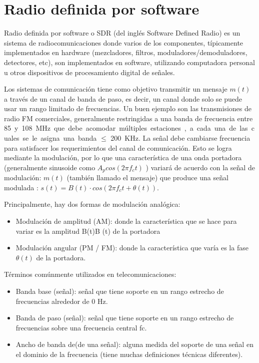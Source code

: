 \section{Radio definida por software}

Radio definida por software o SDR (del inglés Software Defined Radio) es un sistema de radiocomunicaciones donde varios de los componentes, típicamente implementados en hardware (mezcladores, filtros, moduladores/demoduladores, detectores, etc), son implementados en software, utilizando computadora personal u otros dispositivos de procesamiento digital de señales. 


Los sistemas de comunicación tiene como objetivo transmitir un mensaje $m(t)$ a través de un canal de banda de paso, es decir, un canal donde solo se puede usar un rango limitado de frecuencias. 
Un buen ejemplo son las transmisiones de radio FM comerciales, generalmente restringidas a una banda de frecuencia entre \SI{85} y \SI{108}{MHz} que debe acomodar múltiples estaciones, a cada una de las cuales se le asigna una banda $\le$ \SI{200}{KHz}. 
La señal debe cambiarse frecuencia para satisfacer los requerimientos del canal de comunicación.
Esto se logra mediante la modulación, por lo que una característica de una onda portadora (generalmente sinusoide como $ A_p  cos(2 \pi f_c t) $ )  variará de acuerdo con la señal de modulación: $ m (t) $ (también llamado el mensaje) que produce una señal modulada : $ s(t) = B(t) \cdot cos(2 \pi f_c  t + \theta(t) ) $. 


Principalmente, hay dos formas  de modulación analógica: 
\begin{itemize}
    \item Modulación de amplitud (AM): donde la característica que se hace para variar es la amplitud B(t)B (t) de la portadora
    \item Modulación angular (PM / FM): donde la característica que varía es la fase $\theta(t)$ de la portadora.
\end{itemize}

Términos comúnmente utilizados en telecomunicaciones:

\begin{itemize}
    \item Banda base (señal): señal que tiene soporte en un rango estrecho de frecuencias alrededor de 0 Hz.
    \item Banda de paso (señal): señal que tiene soporte en un rango estrecho de frecuencias sobre una frecuencia central fc.
    \item Ancho de banda de(de una señal): alguna medida del soporte de una señal en el dominio de la frecuencia (tiene muchas definiciones técnicas diferentes).
\end{itemize}  


